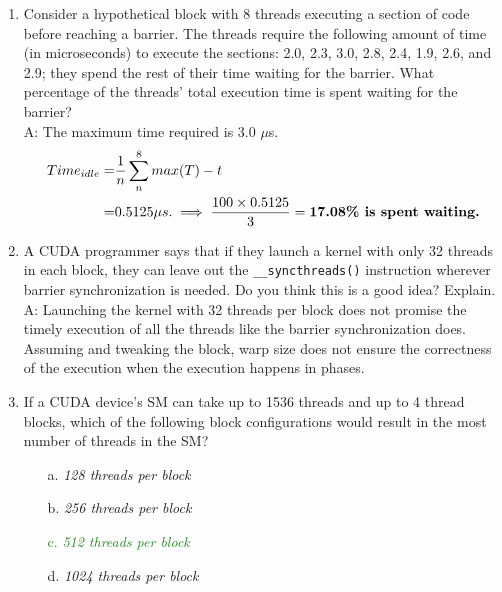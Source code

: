 \begin{enumerate}
\begin{enumerate}
              \item Consider a hypothetical block with 8 threads executing a section of code before reaching a barrier. The threads require the following amount of time (in microseconds) to execute the sections: 2.0, 2.3, 3.0, 2.8, 2.4, 1.9, 2.6, and
                    2.9; they spend the rest of their time waiting for the barrier. What percentage of the threads’ total execution time is spent waiting for the barrier?
                    \\A: The maximum time required is 3.0 \(\mu\)s.\\
                    \begin{equation*}
                        \begin{aligned}
                            Time_{idle} = & \frac{1}{n}\sum_{n}^{8} max(T) - t                                                             \\
                            =             & 0.5125 \mu s. \implies \frac{100 \times 0.5125}{3} = \text{\textbf{17.08\% is spent waiting.}}
                        \end{aligned}
                    \end{equation*}
              \item A CUDA programmer says that if they launch a kernel with only 32 threads in each block, they can leave out the \texttt{\_\_syncthreads()} instruction wherever barrier synchronization is needed. Do you think this is a good idea? Explain.
                    \\A: Launching the kernel with 32 threads per block does not promise the timely execution of all the threads like the barrier synchronization does. Assuming and tweaking the block, warp size does not ensure the correctness of the execution when the execution happens in phases.
              \item If a CUDA device’s SM can take up to 1536 threads and up to 4 thread blocks, which of the following block configurations would result in the most number of threads in the SM?
                    \begin{itemize}
                        \item[a.] \textsl{128 threads per block}
                        \item[b.] \textsl{256 threads per block}
                        \item[\textcolor{ForestGreen}{c.}] \textcolor{ForestGreen}{\textsl{512 threads per block}}
                        \item[d.] \textsl{1024 threads per block}

\end{itemize}
\end{enumerate}
\end{enumerate}
